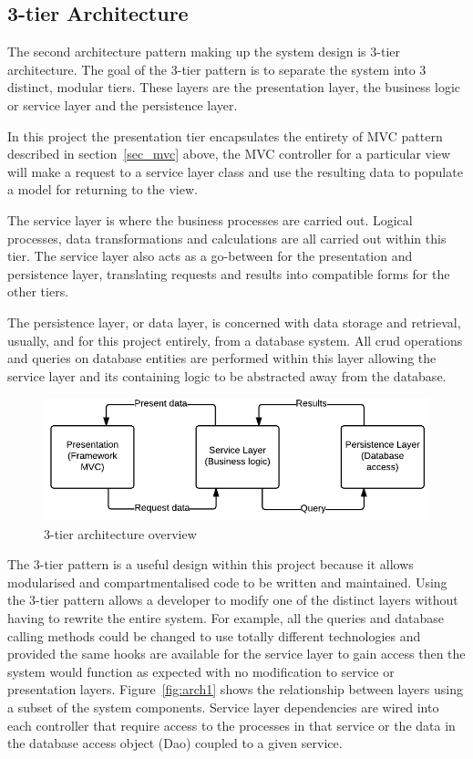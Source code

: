 \subsection{3-tier Architecture}
The second architecture pattern making up the system design is 3-tier architecture. The goal of the 3-tier pattern is to separate the system into 3 distinct, modular tiers. These layers are the presentation layer, the business logic or service layer and the persistence layer.  

In this project the presentation tier encapsulates the entirety of MVC pattern described in section~\ref{sec_mvc} above, the MVC controller for a particular view will make a request to a service layer class and use the resulting data to populate a model for returning to the view.

 The service layer is where the business processes are carried out. Logical processes, data transformations and calculations are all carried out within this tier. The service layer also acts as a go-between for the presentation and persistence layer, translating requests and results into compatible forms for the other tiers.
 
 The persistence layer, or data layer, is concerned with data storage and retrieval, usually, and for this project entirely, from a database system. All crud operations and queries on database entities are performed within this layer allowing the service layer and its containing logic to be abstracted away from the database.
\begin{figure}[H]
    \centering
    \includegraphics[width=\textwidth]{images/design/3t}
    \caption{3-tier architecture overview}
    \label{fig:3t}
\end{figure}

The 3-tier pattern is a useful design within this project because it allows modularised and compartmentalised code to be written and maintained. Using the 3-tier pattern allows a developer to modify one of the distinct layers without having to rewrite the entire system. For example, all the queries and database calling methods could be changed to use totally different technologies and provided the same hooks are available for the service layer to gain access then the system would function as expected with no modification to service or presentation layers. Figure~\ref{fig:arch1} shows the relationship between layers using a subset of the system components. Service layer dependencies are wired into each controller that require access to the processes in that service or the data in the database access object (Dao) coupled to a given service. 

